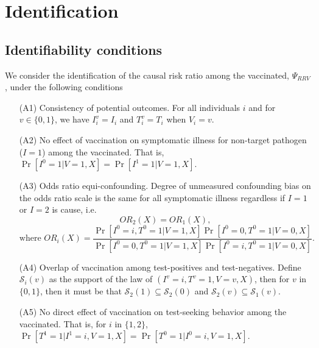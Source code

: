 \documentclass[11pt]{article}
\begin{document}
\section{Identification} \label{sec:identification}
\subsection{Identifiability conditions} \label{sec:conditions}
We consider the identification of the causal risk ratio among the vaccinated, $\Psi_{RRV}$, under the following conditions
\begin{itemize}
    \item[(A1)] Consistency of potential outcomes. For all individuals $i$ and for $v \in \{0, 1\}$, we have $I_i^v = I_i$ and $T_i^v = T_i$ when $V_i = v$.
    \item[(A2)] No effect of vaccination on symptomatic illness for non-target pathogen ($I = 1$) among the vaccinated. That is, $\Pr[I^0 = 1 | V = 1, X] = \Pr[I^1 = 1 | V = 1, X].$
    \item[(A3)] Odds ratio equi-confounding. Degree of unmeasured confounding bias on the odds ratio scale is the same for all symptomatic illness regardless if $I=1$ or $I=2$ is cause, i.e. 
    $$OR_2(X) = OR_1(X), $$
    $$ \text{where } OR_i(X) = \frac{\Pr[I^0 = i, T^0 = 1 | V = 1, X]\Pr[I^0 = 0, T^0 = 1 | V = 0, X]}{\Pr[I^0 = 0, T^0 = 1 | V = 1, X]\Pr[I^0 = i, T^0 = 1| V = 0, X]}.$$
    \item[(A4)] Overlap of vaccination among test-positives and test-negatives. Define $\mathcal{S}_i(v)$ as the support of the law of $(I^v = i, T^v = 1, V = v, X)$, then for $v$ in $\{0,1\}$, then it must be that $\mathcal{S}_2(1) \subseteq \mathcal{S}_2(0)$ and $\mathcal{S}_2(v) \subseteq \mathcal{S}_1(v).$
    \item[(A5)] No direct effect of vaccination on test-seeking behavior among the vaccinated. That is, for $i$ in $\{1,2\}$, $\Pr[T^1 = 1 | I^1 = i, V = 1, X] = \Pr[T^0 = 1 | I^0 = i, V = 1, X].$
\end{itemize}
\end{document}
